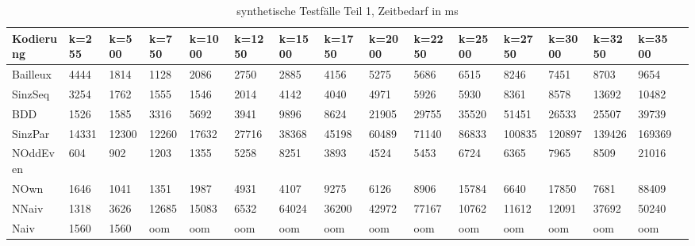 \documentclass[a4,abstract=on]{scrartcl}
\begin{document}
\begin{landscape}
\begin{table}[h!]
    \small
    \setlength{\tabcolsep}{0.11cm}
     \centering
     \begin{tabular}[width=\textwidth]{|l||l|l|l|l|l|l|l|l|l|l|l|l|l|l|l|}
	\hline
       \textbf{Kodierung}  & \textbf{k=255} & \textbf{k=500} & \textbf{k=750} &\textbf{k=1000} &\textbf{k=1250} &\textbf{k=1500} &\textbf{k=1750} &\textbf{k=2000} &\textbf{k=2250} &\textbf{k=2500} &\textbf{k=2750} &\textbf{k=3000} &\textbf{k=3250} &\textbf{k=3500}\\
	\hline
	\hline
	Bailleux & 4444 & 1814 & 1128 & 2086 & 2750 & 2885 & 4156 & 5275 & 5686 & 6515 & 8246 & 7451 & 8703 & 9654  \\
\hline
	SinzSeq & 3254 & 1762 & 1555 & 1546 & 2014 & 4142 & 4040 & 4971 & 5926 & 5930 & 8361 & 8578 & 13692 & 10482  \\
\hline
	BDD & 1526 & 1585 & 3316 & 5692 & 3941 &9896 &8624 &21905 & 29755 & 35520 & 51451 & 26533 & 25507 & 39739 \\
\hline
	SinzPar & 14331 & 12300 & 12260 & 17632 & 27716 & 38368 & 45198 & 60489 & 71140 & 86833 & 100835 & 120897 & 139426 & 169369  \\
\hline
	NOddEven & 604 & 902 & 1203 & 1355 & 5258 & 8251 & 3893 & 4524 & 5453 & 6724& 6365 & 7965 & 8509 & 21016 \\
\hline
	NOwn & 1646 & 1041 & 1351 & 1987 & 4931 & 4107 & 9275 & 6126 & 8906 & 15784 & 6640 & 17850 & 7681 & 88409\\
 \hline
	NNaiv & 1318 & 3626 & 12685 & 15083 & 6532 & 64024 & 36200 & 42972 & 77167 & 10762 & 11612 & 12091 & 37692 & 50240 \\
\hline
	Naiv & 1560 & 1560 &  oom &  oom &  oom &  oom &  oom &  oom &  oom &  oom &  oom &  oom &  oom &  oom \\
\hline
       
     \end{tabular}

     \caption{synthetische Testfälle Teil 1, Zeitbedarf in ms}
     \label{tbl:beispieltabelle}

   \end{table}
	



\end{landscape}
\end{document}
